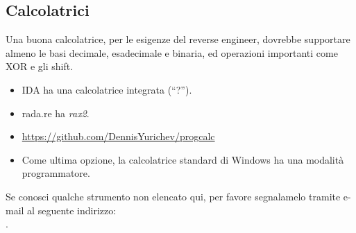 \subsection{Calcolatrici}

Una buona calcolatrice, per le esigenze del reverse engineer, dovrebbe supportare almeno le basi decimale, esadecimale e binaria,
ed operazioni importanti come XOR e gli shift.

\begin{itemize}

\item IDA ha una calcolatrice integrata (``?'').

\item rada.re ha \emph{rax2}.

\item \url{https://github.com/DennisYurichev/progcalc}

\item Come ultima opzione, la calcolatrice standard di Windows ha una modalità programmatore.

\end{itemize}


Se conosci qualche strumento non elencato qui, per favore segnalamelo tramite e-mail al seguente indirizzo:\\
\TT{\EMAIL}.
